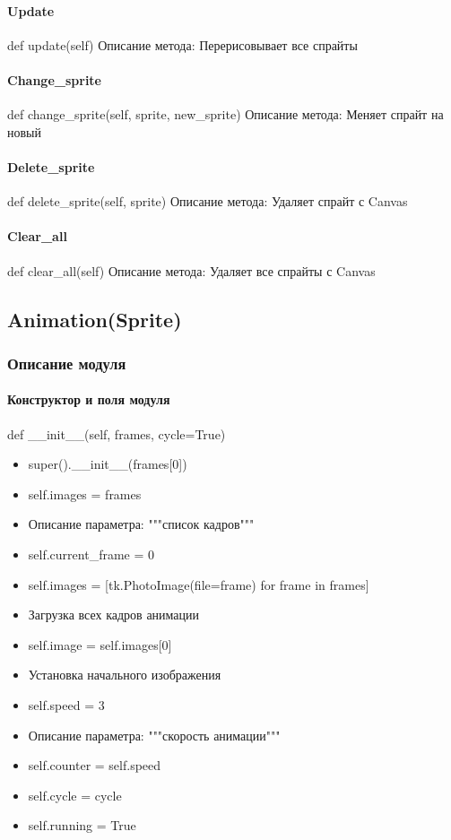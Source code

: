 \paragraph{Update}
def update(self)
Описание метода: Перерисовывает все спрайты
\paragraph{Change\_sprite}
def change\_sprite(self, sprite, new\_sprite)
Описание метода: Меняет  спрайт на новый
\paragraph{Delete\_sprite}
def delete\_sprite(self, sprite)
Описание метода: Удаляет спрайт с Canvas
\paragraph{Clear\_all}
def clear\_all(self)
Описание метода: Удаляет все спрайты с Canvas

\subsection{Animation(Sprite)}
\subsubsection{Описание модуля}
\paragraph{Конструктор и поля модуля}
def \_\_init\_\_(self, frames, cycle=True)
\begin{itemize}
	\item super().\_\_init\_\_(frames[0])
	\item self.images = frames
	\item Описание параметра: """список кадров"""
	\item self.current\_frame = 0
	\item self.images = [tk.PhotoImage(file=frame) for frame in frames]   
	\item Загрузка всех кадров анимации
	\item self.image = self.images[0]
	\item Установка начального изображения
	\item self.speed = 3
	\item Описание параметра: """скорость анимации"""
	\item self.counter = self.speed
	\item self.cycle = cycle
	\item self.running = True
\end{itemize}
